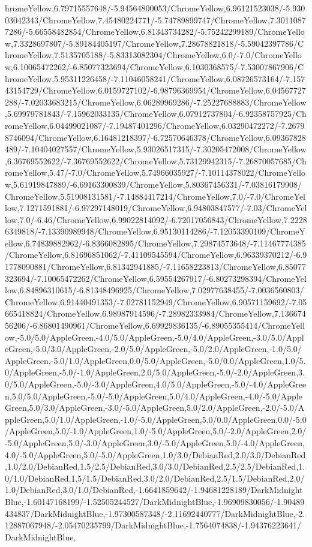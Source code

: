 {\begin{tikzternal}
{hromeYellow,6.79715557648/-5.94564800053/ChromeYellow,6.96121523038/-5.93003042343/ChromeYellow,7.45480224771/-5.74789899747/ChromeYellow,7.30110877286/-5.66558482854/ChromeYellow,6.81343734282/-5.75242299189/ChromeYellow,7.3328697807/-5.89184405197/ChromeYellow,7.28678821818/-5.59042397786/ChromeYellow,7.5135705188/-5.83313082304/ChromeYellow,6.0/-7.0/ChromeYellow,6.10065472262/-6.85077323694/ChromeYellow,6.1030368575/-7.53007867906/ChromeYellow,5.95311226458/-7.11046058241/ChromeYellow,6.08726573164/-7.15743154729/ChromeYellow,6.0159727102/-6.98796369954/ChromeYellow,6.04567727288/-7.02033683215/ChromeYellow,6.06289969286/-7.25227688883/ChromeYellow,5.69979781843/-7.15962033135/ChromeYellow,6.07912737804/-6.92358757925/ChromeYellow,6.04499021087/-7.19487401296/ChromeYellow,6.03290472272/-7.26798746094/ChromeYellow,6.16481218397/-6.72570646378/ChromeYellow,6.09367828489/-7.10404027557/ChromeYellow,5.93026517315/-7.30205472008/ChromeYellow,6.36769552622/-7.36769552622/ChromeYellow,5.73129942315/-7.26870057685/ChromeYellow,5.47/-7.0/ChromeYellow,5.74966035927/-7.10114378022/ChromeYellow,5.61919847889/-6.69163300839/ChromeYellow,5.80367456331/-7.03816179908/ChromeYellow,5.51908131581/-7.14884417214/ChromeYellow,7.0/-7.0/ChromeYellow,7.1271591881/-6.97297148019/ChromeYellow,6.94803847577/-7.03/ChromeYellow,7.0/-6.46/ChromeYellow,6.99022814092/-6.72017056843/ChromeYellow,7.22286349818/-7.13390989948/ChromeYellow,6.95130114286/-7.12053390109/ChromeYellow,6.74839882962/-6.8366082895/ChromeYellow,7.29874573648/-7.11467774385/ChromeYellow,6.81696851062/-7.41109545594/ChromeYellow,6.96339370212/-6.91778090881/ChromeYellow,6.81342941885/-7.11658223813/ChromeYellow,6.85077323694/-7.10065472262/ChromeYellow,6.59554267917/-6.80273298394/ChromeYellow,6.84896310615/-6.81348496925/ChromeYellow,7.02977638455/-7.0036560803/ChromeYellow,6.91440491353/-7.02781152949/ChromeYellow,6.90571159692/-7.05665418824/ChromeYellow,6.98987914596/-7.28982333984/ChromeYellow,7.13667456206/-6.86801490961/ChromeYellow,6.69929836135/-6.89055355414/ChromeYellow,-5.0/5.0/AppleGreen,-4.0/5.0/AppleGreen,-5.0/4.0/AppleGreen,-3.0/5.0/AppleGreen,-5.0/3.0/AppleGreen,-2.0/5.0/AppleGreen,-5.0/2.0/AppleGreen,-1.0/5.0/AppleGreen,-5.0/1.0/AppleGreen,0.0/5.0/AppleGreen,-5.0/0.0/AppleGreen,1.0/5.0/AppleGreen,-5.0/-1.0/AppleGreen,2.0/5.0/AppleGreen,-5.0/-2.0/AppleGreen,3.0/5.0/AppleGreen,-5.0/-3.0/AppleGreen,4.0/5.0/AppleGreen,-5.0/-4.0/AppleGreen,5.0/5.0/AppleGreen,-5.0/-5.0/AppleGreen,5.0/4.0/AppleGreen,-4.0/-5.0/AppleGreen,5.0/3.0/AppleGreen,-3.0/-5.0/AppleGreen,5.0/2.0/AppleGreen,-2.0/-5.0/AppleGreen,5.0/1.0/AppleGreen,-1.0/-5.0/AppleGreen,5.0/0.0/AppleGreen,0.0/-5.0/AppleGreen,5.0/-1.0/AppleGreen,1.0/-5.0/AppleGreen,5.0/-2.0/AppleGreen,2.0/-5.0/AppleGreen,5.0/-3.0/AppleGreen,3.0/-5.0/AppleGreen,5.0/-4.0/AppleGreen,4.0/-5.0/AppleGreen,5.0/-5.0/AppleGreen,1.0/3.0/DebianRed,2.0/3.0/DebianRed,1.0/2.0/DebianRed,1.5/2.5/DebianRed,3.0/3.0/DebianRed,2.5/2.5/DebianRed,1.0/1.0/DebianRed,1.5/1.5/DebianRed,3.0/2.0/DebianRed,2.5/1.5/DebianRed,2.0/1.0/DebianRed,3.0/1.0/DebianRed,-1.6641859642/-1.94681228189/DarkMidnightBlue,-1.60147168199/-1.52505244527/DarkMidnightBlue,-1.96909830056/-1.90489434837/DarkMidnightBlue,-1.97300587348/-2.11692440777/DarkMidnightBlue,-2.12887067948/-2.05470235799/DarkMidnightBlue,-1.7564074838/-1.94376223641/DarkMidnightBlue,
}
\end{tikzternal}}
